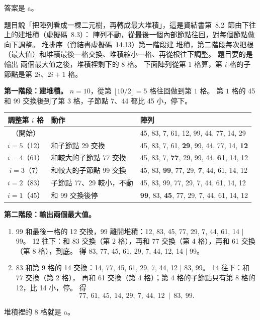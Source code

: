 \begin{pastsoln}
答案是 a。

題目說「把陣列看成一棵二元樹，再轉成最大堆積」，這是資結書第~8.2~節由下往上的建堆積（虛擬碼~8.3）：
陣列不動，從最後一個內部節點往回，對每個節點做向下調整。 堆排序（資結書虛擬碼~14.13）第一階段建
堆積，第二階段每次把根（最大值）和堆積最後一格交換、堆積縮小一格、再從根往下調整。 題目要的是輸出
兩個最大值之後，堆積裡剩下的 $8$ 格。 下面陣列從第 $1$ 格算，第 $i$ 格的子節點是第 $2i$、$2i + 1$ 格。

\textbf{第一階段：建堆積。} $n = 10$，從第 $\lfloor 10/2 \rfloor = 5$ 格往回做到第 $1$ 格。 第 $1$ 格的 45 和
99 交換後到了第 $3$ 格，子節點 7、44 都比 45 小，停下。
\begin{center}
\small
\begin{tabular}{cll}
\toprule
調整第 $i$ 格 & 動作 & 陣列 \\
\midrule
（開始） & & 45, 83, 7, 61, 12, 99, 44, 77, 14, 29 \\
$i = 5$（12） & 和子節點 29 交換 & 45, 83, 7, 61, \textbf{29}, 99, 44, 77, 14, \textbf{12} \\
$i = 4$（61） & 和較大的子節點 77 交換 & 45, 83, 7, \textbf{77}, 29, 99, 44, \textbf{61}, 14, 12 \\
$i = 3$（7） & 和較大的子節點 99 交換 & 45, 83, \textbf{99}, 77, 29, \textbf{7}, 44, 61, 14, 12 \\
$i = 2$（83） & 子節點 77、29 較小，不動 & 45, 83, 99, 77, 29, 7, 44, 61, 14, 12 \\
$i = 1$（45） & 和 99 交換後停 & \textbf{99}, 83, \textbf{45}, 77, 29, 7, 44, 61, 14, 12 \\
\bottomrule
\end{tabular}
\end{center}

\textbf{第二階段：輸出兩個最大值。}
\begin{enumerate}
\item 99 和最後一格的 12 交換，99 離開堆積：12, 83, 45, 77, 29, 7, 44, 61, 14 $\mid$ 99。 12 往下：和
83 交換（第 2 格），再和 77 交換（第 4 格），再和 61 交換（第 8 格），到底。 得
83, 77, 45, 61, 29, 7, 44, 12, 14 $\mid$ 99。
\item 83 和第 9 格的 14 交換：14, 77, 45, 61, 29, 7, 44, 12 $\mid$ 83, 99。 14 往下：和 77 交換（第 2 格），
再和 61 交換（第 4 格）；第 4 格的子節點只有第 8 格的 12，比 14 小，停。 得
\[
77,\ 61,\ 45,\ 14,\ 29,\ 7,\ 44,\ 12 \ \mid\ 83,\ 99.
\]
\end{enumerate}
堆積裡的 $8$ 格就是 a。


\end{pastsoln}
